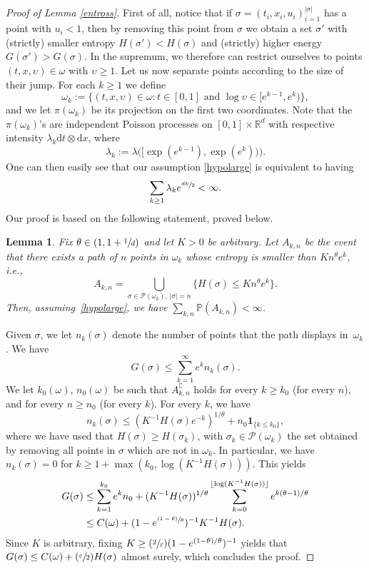 \documentclass[11pt]{article}
\newcommand{\ie}{i.e.,\xspace}
\numberwithin{equation}{section}
\let\mathcal\mathscr
\let\sep:
\newcommand{\Psfrac}[2]{(\sfrac{#1}{#2})}
\newcommand{\psfrac}[2]{\sfrac{(#1)}{#2}}
\newtheorem{lemma}[theorem]{Lemma}
\theoremstyle{definition}
\newcommand{\dd}{\mathrm{d}}
\newcommand{\ind}{\mathbf{1}}
\let\cc\complement
\newcommand{\cP}{{\ensuremath{\mathcal P}} }
\newcommand{\bbP}{{\ensuremath{\mathbb P}} }
\newcommand{\bbR}{{\ensuremath{\mathbb R}} }
\let\gep\varepsilon
\let\gl\lambda
\let\ups\upsilon
\let\go\omega
\begin{document}
\begin{proof}[Proof of Lemma \ref{entross}]
First of all, notice that if $\sigma = (t_i,x_i,u_i)_{i=1}^{|\sigma|}$
has a point with $u_i < 1$,
then by removing this point from $\sigma$
we obtain a set $\sigma'$ with (strictly) smaller entropy $H(\sigma') < H(\sigma)$ and (strictly) higher energy $G(\sigma') > G(\sigma)$.
In the supremum, we therefore can restrict ourselves to points
$(t,x,\ups) \in \go$ with $\ups\geq 1$.
Let us now separate points according to the size of their jump.
For each $k\ge 1$ we define
\[
\go_k := \bigl\{ (t,x, \ups)\in \go \sep t\in[0,1] \text{ and } \log \ups \in [ e^{k-1}, e^{k}) \bigr\},
\]
and we let $\pi(\go_k)$ be its projection on the first two coordinates.
Note that the $\pi(\go_k)$'s are independent Poisson processes on $[0,1]\times \bbR^d$ with respective intensity $\lambda_k \dd t\otimes \dd x$, where
\[
\gl_k:= \gl\bigl(\bigl[\exp(e^{k-1}), \exp(e^k) \bigr) \bigr).
\]
One can then easily see that our assumption \eqref{hypolarge}
is equivalent to
having
\begin{equation}
\label{eq:condition}
\sum_{k\ge 1} \gl_k e^{ \sfrac{dk}{2}}<\infty.
\end{equation}
Our proof is based on the following statement, proved below.
\begin{lemma}\label{bcantelli}
Fix $\theta\in \left(1, 1+\sfrac{1}{d}\right)$ and let $K>0$ be arbitrary.
Let $A_{k,n}$ be the event that there exists a path of $n$ points in $\go_k$ whose entropy is smaller than $K n^{\theta} e^{k}$,
\ie 
\[
A_{k,n} = \bigcup_{ \sigma \in \cP(\go_k),\, |\sigma|=n } \bigl\{ H(\sigma) \leq K n^{\theta} e^k \bigr\}.
\]
Then, assuming~\eqref{hypolarge}, we have $\sum_{k,n} \bbP(A_{k,n})<\infty$.
\end{lemma}
 Given $\sigma$, we let $n_k(\sigma)$ denote the number of points that the path displays in~$\go_k$.
We have
\begin{equation}
G(\sigma)\le \sum_{k=1}^{\infty} e^{k} n_k(\sigma).
\end{equation}
We let $k_0(\go)$, $n_0(\go)$ be such that $A_{k,n}^{\cc}$ holds for every $k\ge k_0$ (for every $n$), and for every $n\ge n_0$ (for every $k$).
For every $k$, we have
\begin{equation}
n_k(\sigma)\le (K^{-1} H(\sigma)e^{-k})^{ 1/\theta} +n_0\ind_{\{k\le k_0\}},
\end{equation}
where we have used that $H(\sigma) \geq H(\sigma_k)$, with $\sigma_k \in \cP(\go_k)$ the set obtained by removing all points in $\sigma$ which are not in $\go_k$.
In particular, we have $n_k(\sigma)=0$ for $k\ge 1+ \max(k_0, \log (K^{-1} H(\sigma)))$.
This yields
\begin{align*}
G(\sigma) &\le \sum_{k=1}^{k_0} e^k n_0
+ (K^{-1} H(\sigma))^{1/\theta} \sum_{k=0}^{\lfloor \log (K^{-1}H(\sigma)) \rfloor}
e^{k(\theta-1) /\theta} \\
& \le C(\go)+ (1-e^{\psfrac{1-\theta}{\theta}})^{-1} K^{-1} H(\sigma).
\end{align*}
Since $K$ is arbitrary, fixing $K \geq \Psfrac{2}{\gep} (1-e^{(1-\theta)/\theta})^{-1}$ yields that
$G(\sigma) \leq C(\go) + \Psfrac{\gep}{2} H(\sigma)$ almost surely, which concludes the proof.
\end{proof}
\end{document}
